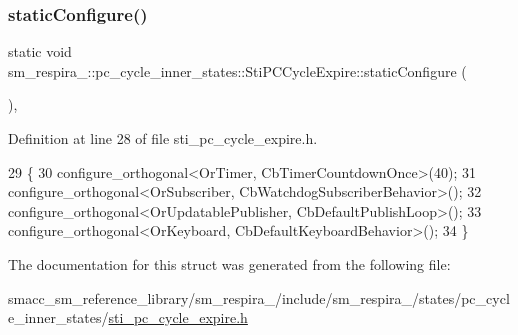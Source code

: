 \subsubsection{\texorpdfstring{static\+Configure()}{staticConfigure()}}
{\footnotesize\ttfamily static void sm\+\_\+respira\+\_\+::pc\+\_\+cycle\+\_\+inner\+\_\+states\+::\+Sti\+P\+C\+Cycle\+Expire\+::static\+Configure (\begin{DoxyParamCaption}{ }\end{DoxyParamCaption})\hspace{0.3cm}{\ttfamily [inline]}, {\ttfamily [static]}}



Definition at line 28 of file sti\+\_\+pc\+\_\+cycle\+\_\+expire.\+h.


\begin{DoxyCode}
29   \{
30     configure\_orthogonal<OrTimer, CbTimerCountdownOnce>(40);
31     configure\_orthogonal<OrSubscriber, CbWatchdogSubscriberBehavior>();
32     configure\_orthogonal<OrUpdatablePublisher, CbDefaultPublishLoop>();
33     configure\_orthogonal<OrKeyboard, CbDefaultKeyboardBehavior>();
34   \}
\end{DoxyCode}


The documentation for this struct was generated from the following file\+:\begin{DoxyCompactItemize}
\item 
smacc\+\_\+sm\+\_\+reference\+\_\+library/sm\+\_\+respira\+\_/include/sm\+\_\+respira\+\_/states/pc\+\_\+cycle\+\_\+inner\+\_\+states/\hyperlink{sti__pc__cycle__expire_8h}{sti\+\_\+pc\+\_\+cycle\+\_\+expire.\+h}\end{DoxyCompactItemize}
